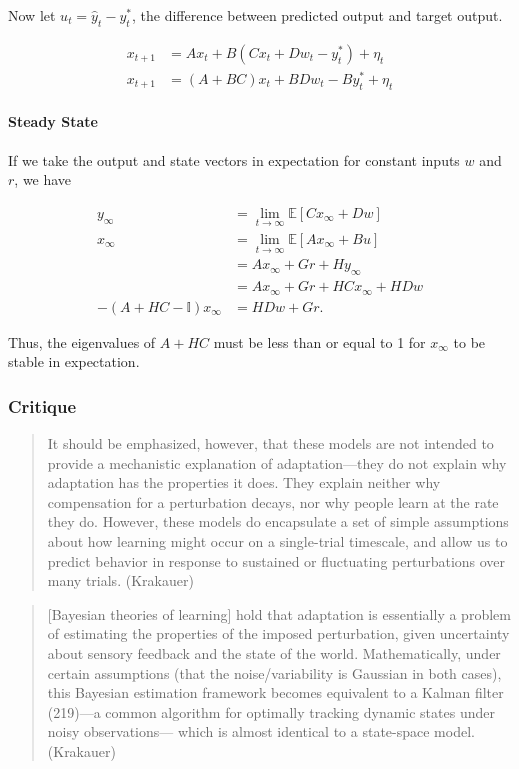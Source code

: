 \documentclass[../main.tex]{subfiles}
\begin{document}
Now let \(u_t = \hat{y}_t - y^*_t\), the difference between predicted
output and target output.

\[
\begin{aligned}
x_{t+1} &= Ax_t + B(Cx_t + Dw_t - y^*_t) + \eta_t \\
x_{t+1} &= (A+BC)x_t + BDw_t - By^*_t + \eta_t
\end{aligned}
\]

\paragraph{Steady State}\label{steady-state}

If we take the output and state vectors in expectation for constant
inputs \(w\) and \(r\), we have

\[
\begin{aligned}
y_\infty &= \lim_{t\to\infty}\mathbb{E}\left[Cx_\infty + Dw\right] \\
x_\infty &= \lim_{t\to\infty}\mathbb{E}\left[Ax_\infty + Bu\right] \\
&= Ax_\infty + Gr + Hy_\infty \\
&= Ax_\infty + Gr + HCx_\infty + HDw \\
-(A + HC - \mathbb{I})x_\infty &= HDw + Gr.
\end{aligned}
\]

Thus, the eigenvalues of \(A + HC\) must be less than or equal to 1 for
\(x_\infty\) to be stable in expectation.

\subsubsection{Critique}\label{critique}

\begin{quote}
It should be emphasized, however, that these models are not intended to
provide a mechanistic explanation of adaptation---they do not explain
why adaptation has the properties it does. They explain neither why
compensation for a perturbation decays, nor why people learn at the rate
they do. However, these models do encapsulate a set of simple
assumptions about how learning might occur on a single-trial timescale,
and allow us to predict behavior in response to sustained or fluctuating
perturbations over many trials. (Krakauer)
\end{quote}

\begin{quote}
{[}Bayesian theories of learning{]} hold that adaptation is essentially
a problem of estimating the properties of the imposed perturbation,
given uncertainty about sensory feedback and the state of the world.
Mathematically, under certain assumptions (that the noise/variability is
Gaussian in both cases), this Bayesian estimation framework becomes
equivalent to a Kalman filter (219)---a common algorithm for optimally
tracking dynamic states under noisy observations--- which is almost
identical to a state-space model. (Krakauer)
\end{quote}
\end{document}
